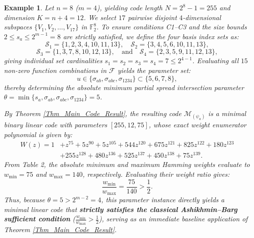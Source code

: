 \documentclass[10pt,a4paper]{amsart}
\newtheorem{example}{Example}%
\begin{document}
\begin{example}\label{ex:AB_strictly_greater}
Let $n = 8$ ($m = 4$), yielding code length $N = 2^8 - 1 = 255$ and dimension $K = n + 4 = 12$. We select $17$ pairwise disjoint $4$-dimensional subspaces $\{V_1, V_2, \ldots, V_{17}\}$ in $\mathbb{F}_2^8$. To ensure conditions C1--C3 and the size bounds $2 \le s_a \le 2^{m-1} = 8$ are strictly satisfied, we define the four basis index sets as:
\[
\mathcal{S}_1 = \{1, 2, 3, 4, 10, 11, 13\}, \quad \mathcal{S}_2 = \{3, 4, 5, 6, 10, 11, 13\},
\]
\[
\mathcal{S}_3 = \{1, 3, 7, 8, 10, 12, 13\}, \quad \text{and} \quad \mathcal{S}_4 = \{2, 3, 5, 9, 11, 12, 13\},
\]
giving individual set cardinalities $s_1 = s_2 = s_3 = s_4 = 7 \le 2^{4-1}$.
Evaluating all $15$ non-zero function combinations in $\mathcal{F}$ yields the parameter set:
\[
u \in \{\sigma_{ab}, \sigma_{abc}, \sigma_{1234}\} \subset \{5, 6, 7, 8\},
\]
thereby determining the absolute minimum partial spread intersection parameter $\theta = \min \{s_a, \sigma_{ab}, \sigma_{abc}, \sigma_{1234}\} = 5$.

By Theorem \ref{Thm_Main_Code_Result}, the resulting code $\mathcal{M}_{(\psi_a)}$ is a minimal binary linear code with parameters $[255, 12, 75]$, whose exact weight enumerator polynomial is given by:
\[
\begin{aligned}
W(z) = 1 &+ z^{75} + 5z^{90} + 5z^{105} + 544z^{120} + 675z^{121} + 825z^{122} + 180z^{123} \\
&+ 255z^{128} + 480z^{136} + 525z^{137} + 450z^{138} + 75z^{139}.
\end{aligned}
\] From Table 2, the absolute minimum and maximum Hamming weights evaluate to $w_{\min} = 75$ and $w_{\max} = 140$, respectively. Evaluating their weight ratio gives:
\[
\frac{w_{\min}}{w_{\max}} = \frac{75}{140} > \frac{1}{2}.
\]
Thus, because $\theta = 5 > 2^{m-2} = 4$, this parameter instance directly yields a minimal linear code that \textbf{strictly satisfies the classical Ashikhmin--Barg sufficient condition} ($\frac{w_{\min}}{w_{\max}} > \frac{1}{2}$), serving as an immediate baseline application of Theorem \ref{Thm_Main_Code_Result}. 

\end{example}
\end{document}
